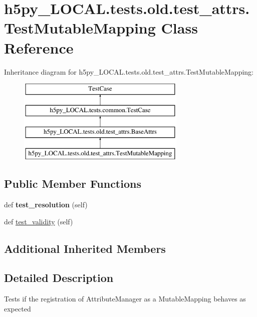 \hypertarget{classh5py__LOCAL_1_1tests_1_1old_1_1test__attrs_1_1TestMutableMapping}{}\section{h5py\+\_\+\+L\+O\+C\+A\+L.\+tests.\+old.\+test\+\_\+attrs.\+Test\+Mutable\+Mapping Class Reference}
\label{classh5py__LOCAL_1_1tests_1_1old_1_1test__attrs_1_1TestMutableMapping}
Inheritance diagram for h5py\+\_\+\+L\+O\+C\+A\+L.\+tests.\+old.\+test\+\_\+attrs.\+Test\+Mutable\+Mapping\+:\begin{figure}[H]
\begin{center}
\leavevmode
\includegraphics[height=4.000000cm]{classh5py__LOCAL_1_1tests_1_1old_1_1test__attrs_1_1TestMutableMapping}
\end{center}
\end{figure}
\subsection*{Public Member Functions}
\begin{DoxyCompactItemize}
\item 
\mbox{\label{classh5py__LOCAL_1_1tests_1_1old_1_1test__attrs_1_1TestMutableMapping_aeddb7844c225fcfb91b8d7b266679e05}} 
def {\bfseries test\+\_\+resolution} (self)
\item 
def \hyperlink{classh5py__LOCAL_1_1tests_1_1old_1_1test__attrs_1_1TestMutableMapping_a193c8825ac8307a8c16c90baf561d6a3}{test\+\_\+validity} (self)
\end{DoxyCompactItemize}
\subsection*{Additional Inherited Members}


\subsection{Detailed Description}
\begin{DoxyVerb}Tests if the registration of AttributeManager as a MutableMapping
behaves as expected
\end{DoxyVerb}
 

